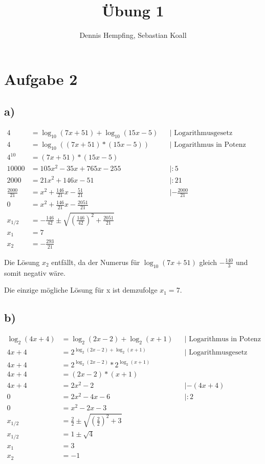 \documentclass[12pt]{scrartcl}%
\theoremstyle{nonumberplain}
\begin{document}
\author{Dennis Hempfing, Sebastian Koall}
\title{Übung 1}
\date{} 
\pagestyle{myheadings}

\maketitle %
 
\section*{Aufgabe 2}
\subsection*{a)}

\begin{align*}
4 &= \log_{10}{(7x+51)} + \log_{10}{(15x-5)} &&|\text{ Logarithmusgesetz anwenden} \\
4 &= \log_{10}{((7x+51) * (15x-5))} &&|\text{ Logarithmus in Potenz umschreiben} \\
4^{10} &= (7x+51) * (15x-5) \\
10000 &= 105x^2 - 35x + 765x - 255 &&|:5\\
2000 &= 21x^2 + 146x - 51 &&|:21\\
\frac{2000}{21} &= x^2 + \frac{146}{21} x - \frac{51}{21} &&|-\frac{2000}{21}\\
0 &= x^2 + \frac{146}{21} x - \frac{2051}{21} \\
x_{1/2} &= -\frac{146}{42} \pm \sqrt{\left(\frac{146}{42}\right)^2 + \frac{2051}{21}} \\
x_{1} &= 7 \\
x_{2} &= -\frac{293}{21}
\end{align*}

Die Lösung $x_2$ entfällt, da der Numerus für $\log_{10}{(7x+51)}$ gleich $-\frac{140}{3}$ und somit negativ wäre.

Die einzige mögliche Lösung für x ist demzufolge $x_1 = 7$.

\subsection*{b)}
\begin{align*}
\log_{2}(4x+4) &= \log_{2}{(2x-2)} + \log_{2}(x+1) &&|\text{ Logarithmus in Potenz umschreiben} \\
4x + 4 &= 2^{\log_{2}{(2x-2)} + \log_{2}(x+1)} &&|\text{ Logarithmusgesetz anwenden} \\
4x + 4 &= 2^{\log_{2}{(2x-2)}} * 2^{\log_{2}(x+1)} \\
4x + 4 &= (2x - 2) * (x + 1) \\
4x + 4 &= 2x^2 - 2 &&|-(4x+4)\\
0 &= 2x^2 - 4x - 6 &&|:2\\
0 &= x^2 - 2x - 3 \\
x_{1/2} &= \frac{2}{2} \pm \sqrt{\left(\frac{2}{2}\right)^2 + 3} \\
x_{1/2} &= 1 \pm \sqrt{4} \\
x_{1} &= 3 \\
x_{2} &= -1
\end{align*}
\end{document}
